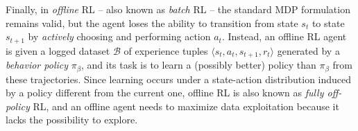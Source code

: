 Finally, in \textit{offline} RL -- also known as \textit{batch} RL --
the standard MDP formulation remains valid, but the agent loses the
ability to transition
from state $s_t$ to state $s_{t+1}$ by \textit{actively} choosing and
performing action $a_t$. Instead, an offline RL agent is given a
logged dataset $\mathcal{B}$ of experience tuples
$\langle s_t,a_t,s_{t+1},r_t\rangle$ generated by a \textit{behavior
policy} $\pi_{\beta}$, and its task is to learn a (possibly better)
policy than $\pi_{\beta}$ from these trajectories.
Since learning occurs under a state-action distribution induced by a
policy different from the current one, offline RL is also
known as \textit{fully off-policy} RL, and an offline agent needs to
maximize data exploitation because it lacks the possibility to
explore.
